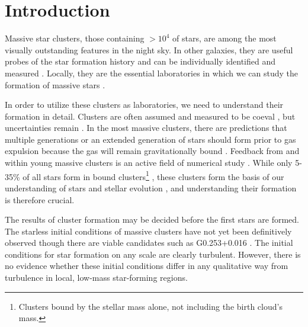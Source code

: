 \maketitle

\section{Introduction}

Massive star clusters, those containing $>10^4$ \msun of stars, are among the
most visually outstanding features in the night sky.  In other galaxies, they
are useful probes of the star formation history and can be individually
identified and measured \citep{Bastian2008a}.  Locally, they are the essential
laboratories in which we can study the formation of massive stars
\citep{Davies2012a}.

In order to utilize these clusters as laboratories, we need to understand their
formation in detail.  Clusters are often assumed and measured to be coeval
,
but uncertainties remain \citep{Beccari2010a}.
In the most massive clusters, there are predictions that multiple generations
or an extended generation of stars should form prior to gas expulsion because
the gas will remain gravitationally bound \citep{Bressert2012a}.   Feedback from
and within young massive clusters is an active field of numerical study
\citep{Rogers2013a,Dale2013a,Dale2012a,Dale2008a,Dale2005a,Parker2013a,Myers2014a,Krumholz2014a}.
While
only 5-35\% of all stars form in bound clusters\footnote{Clusters bound by the
stellar mass alone, not including the birth cloud's mass.}
\citep{Kruijssen2012a}, these clusters form the basis of our understanding of
stars and stellar evolution
\citep{Kalirai2010a}, and understanding their formation is therefore crucial.

The results of cluster formation may be decided before the first stars are
formed.  The starless initial conditions of massive clusters have not yet been
definitively observed \citep{Ginsburg2012a} though there are viable candidates
such as G0.253+0.016 \citep{Longmore2012b}.  The initial conditions for star
formation on any scale are clearly turbulent.  However, there is no evidence
whether these initial conditions differ in any qualitative way from turbulence
in local, low-mass star-forming regions.

